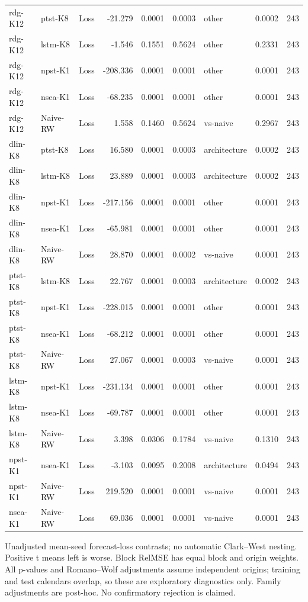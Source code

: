 \begin{table}[!t]
\begin{tabular}{llcrrrlrr}
rdg-K12 & ptst-K8 & Loss & -21.279 & 0.0001 & 0.0003 & other & 0.0002 & 243 \\
rdg-K12 & lstm-K8 & Loss & -1.546 & 0.1551 & 0.5624 & other & 0.2331 & 243 \\
rdg-K12 & npst-K1 & Loss & -208.336 & 0.0001 & 0.0001 & other & 0.0001 & 243 \\
rdg-K12 & nsea-K1 & Loss & -68.235 & 0.0001 & 0.0001 & other & 0.0001 & 243 \\
rdg-K12 & Naive-RW & Loss & 1.558 & 0.1460 & 0.5624 & vs-naive & 0.2967 & 243 \\
dlin-K8 & ptst-K8 & Loss & 16.580 & 0.0001 & 0.0003 & architecture & 0.0002 & 243 \\
dlin-K8 & lstm-K8 & Loss & 23.889 & 0.0001 & 0.0003 & architecture & 0.0002 & 243 \\
dlin-K8 & npst-K1 & Loss & -217.156 & 0.0001 & 0.0001 & other & 0.0001 & 243 \\
dlin-K8 & nsea-K1 & Loss & -65.981 & 0.0001 & 0.0001 & other & 0.0001 & 243 \\
dlin-K8 & Naive-RW & Loss & 28.870 & 0.0001 & 0.0002 & vs-naive & 0.0001 & 243 \\
ptst-K8 & lstm-K8 & Loss & 22.767 & 0.0001 & 0.0003 & architecture & 0.0002 & 243 \\
ptst-K8 & npst-K1 & Loss & -228.015 & 0.0001 & 0.0001 & other & 0.0001 & 243 \\
ptst-K8 & nsea-K1 & Loss & -68.212 & 0.0001 & 0.0001 & other & 0.0001 & 243 \\
ptst-K8 & Naive-RW & Loss & 27.067 & 0.0001 & 0.0003 & vs-naive & 0.0001 & 243 \\
lstm-K8 & npst-K1 & Loss & -231.134 & 0.0001 & 0.0001 & other & 0.0001 & 243 \\
lstm-K8 & nsea-K1 & Loss & -69.787 & 0.0001 & 0.0001 & other & 0.0001 & 243 \\
lstm-K8 & Naive-RW & Loss & 3.398 & 0.0306 & 0.1784 & vs-naive & 0.1310 & 243 \\
npst-K1 & nsea-K1 & Loss & -3.103 & 0.0095 & 0.2008 & architecture & 0.0494 & 243 \\
npst-K1 & Naive-RW & Loss & 219.520 & 0.0001 & 0.0001 & vs-naive & 0.0001 & 243 \\
nsea-K1 & Naive-RW & Loss & 69.036 & 0.0001 & 0.0001 & vs-naive & 0.0001 & 243 \\
\bottomrule
\end{tabular}
\vspace{2pt}\par\footnotesize Unadjusted mean-seed forecast-loss contrasts; no automatic Clark--West nesting. Positive t means left is worse. Block RelMSE has equal block and origin weights. All p-values and Romano--Wolf adjustments assume independent origins; training and test calendars overlap, so these are exploratory diagnostics only. Family adjustments are post-hoc. No confirmatory rejection is claimed.
\end{table}
